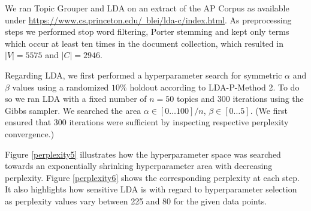 \documentclass[10pt, a4paper, oneside]{article}
\begin{document}
We ran Topic Grouper and LDA on an extract of the AP Corpus as available under \href{https://www.cs.princeton.edu/~blei/lda-c/index.html}{https://www.cs.princeton.edu/~blei/lda-c/index.html}. As preprocessing steps we performed stop word filtering, Porter stemming and kept only terms which occur at least ten times in the document collection, which resulted in $|V| = 5575$ and $|C| = 2946$.

Regarding LDA, we first performed a hyperparameter search for symmetric $\alpha$ and $\beta$ values using a randomized $10\%$ holdout according to
LDA-P-Method 2. To do so we ran LDA with a fixed number of $n = 50$ topics and 300 iterations using the Gibbs sampler. We searched the area $\alpha \in [0 \ldots 100] / n$, $\beta \in [0 \ldots 5]$. (We first ensured that 300 iterations were sufficient by inspecting respective perplexity convergence.)

Figure \ref{perplexity5} illustrates how the hyperparameter space was searched towards an exponentially shrinking hyperparameter area with decreasing perplexity.
Figure \ref{perplexity6} shows the corresponding perplexity at each step. It also highlights how sensitive LDA is with regard to hyperparameter selection as perplexity values vary between 225 and 80 for the given data points.
\end{document}
